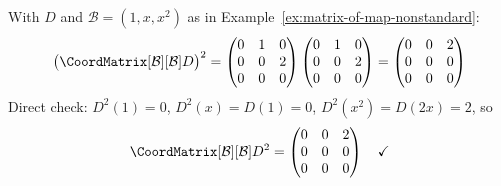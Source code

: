 \begin{example}[{$\CoordMatrix[\mathcal{B}][\mathcal{B}]{\Composition{D}{D}} = \bigl(\CoordMatrix[\mathcal{B}][\mathcal{B}]{D}\bigr)^2$} --- II]
    With $D$ and $\mathcal{B} = (1, x, x^2)$ as in
    Example~\ref{ex:matrix-of-map-nonstandard}:
    \[
        \bigl(\CoordMatrix[\mathcal{B}][\mathcal{B}]{D}\bigr)^2
        = \begin{pmatrix} 0 & 1 & 0 \\ 0 & 0 & 2 \\ 0 & 0 & 0 \end{pmatrix}
          \begin{pmatrix} 0 & 1 & 0 \\ 0 & 0 & 2 \\ 0 & 0 & 0 \end{pmatrix}
        = \begin{pmatrix} 0 & 0 & 2 \\ 0 & 0 & 0 \\ 0 & 0 & 0 \end{pmatrix}
    \]
    Direct check: $D^2(1) = 0$, $D^2(x) = D(1) = 0$, $D^2(x^2) = D(2x) = 2$, so
    \[
        \CoordMatrix[\mathcal{B}][\mathcal{B}]{D^2}
        = \begin{pmatrix} 0 & 0 & 2 \\ 0 & 0 & 0 \\ 0 & 0 & 0 \end{pmatrix}
        \quad \checkmark
    \]
\end{example}
